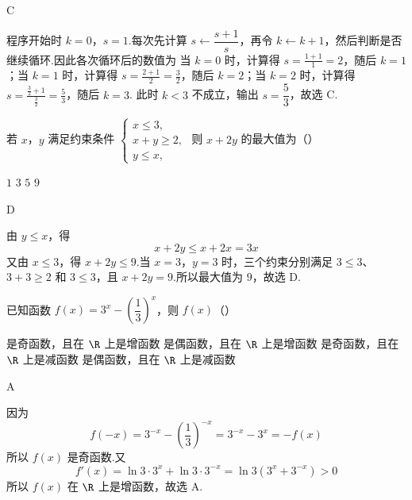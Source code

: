 \begin{answer}
C
\end{answer}

\begin{solution}
程序开始时 \(k=0\)，\(s=1\).每次先计算 \(s\leftarrow\dfrac{s+1}{s}\)，再令 \(k\leftarrow k+1\)，然后判断是否继续循环.因此各次循环后的数值为
当 \(k=0\) 时，计算得 \(s=\frac{1+1}{1}=2\)，随后 \(k=1\)；当 \(k=1\) 时，计算得 \(s=\frac{2+1}{2}=\frac32\)，随后 \(k=2\)；当 \(k=2\) 时，计算得 \(s=\frac{\frac32+1}{\frac32}=\frac53\)，随后 \(k=3\).
此时 \(k<3\) 不成立，输出 \(s=\dfrac53\)，故选 C.
\end{solution}

\begin{problem}
若 \(x\)，\(y\) 满足约束条件 \(\begin{cases}
x\le 3,\\
x+y\ge 2,\\
y\le x,
\end{cases}\) 则 \(x+2y\) 的最大值为（\quad）

\choices
    {\(1\)}
    {\(3\)}
    {\(5\)}
    {\(9\)}
\end{problem}

\begin{answer}
D
\end{answer}

\begin{solution}
由 \(y\le x\)，得
\[
x+2y\le x+2x=3x
\]
又由 \(x\le3\)，得 \(x+2y\le9\).当 \(x=3\)，\(y=3\) 时，三个约束分别满足 \(3\le3\)、\(3+3\ge2\) 和 \(3\le3\)，且 \(x+2y=9\).所以最大值为 \(9\)，故选 D.
\end{solution}

\begin{problem}
已知函数 \(f(x)=3^x-\left(\dfrac13\right)^x\)，则 \(f(x)\)（\quad）

\choices
    {是奇函数，且在 \(\R\) 上是增函数}
    {是偶函数，且在 \(\R\) 上是增函数}
    {是奇函数，且在 \(\R\) 上是减函数}
    {是偶函数，且在 \(\R\) 上是减函数}
\end{problem}

\begin{answer}
A
\end{answer}

\begin{solution}
因为
\[
f(-x)=3^{-x}-\left(\frac13\right)^{-x}=3^{-x}-3^x=-f(x)
\]
所以 \(f(x)\) 是奇函数.又
\[
f'(x)=\ln3\cdot3^x+\ln3\cdot3^{-x}=\ln3\left(3^x+3^{-x}\right)>0
\]
所以 \(f(x)\) 在 \(\R\) 上是增函数，故选 A.
\end{solution}

